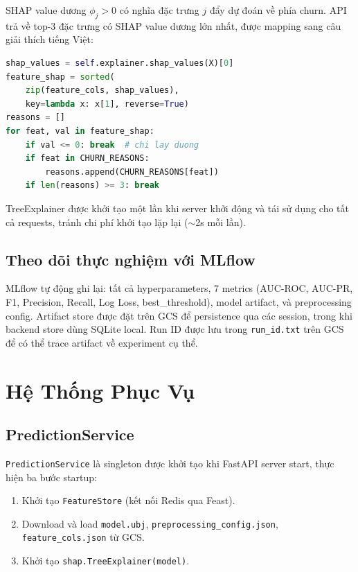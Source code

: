 \documentclass[conference]{IEEEtran}
\begin{document}
SHAP value dương $\phi_j > 0$ có nghĩa đặc trưng $j$ đẩy dự đoán về phía
churn. API trả về top-3 đặc trưng có SHAP value dương lớn nhất, được mapping
sang câu giải thích tiếng Việt:

\begin{lstlisting}[language=Python, caption={Top-3 SHAP reasons}]
shap_values = self.explainer.shap_values(X)[0]
feature_shap = sorted(
    zip(feature_cols, shap_values),
    key=lambda x: x[1], reverse=True)
reasons = []
for feat, val in feature_shap:
    if val <= 0: break  # chi lay duong
    if feat in CHURN_REASONS:
        reasons.append(CHURN_REASONS[feat])
    if len(reasons) >= 3: break
\end{lstlisting}

TreeExplainer được khởi tạo một lần khi server khởi động và tái sử dụng cho
tất cả requests, tránh chi phí khởi tạo lặp lại ($\sim$2s mỗi lần).

\subsection{Theo dõi thực nghiệm với MLflow}

MLflow tự động ghi lại: tất cả hyperparameters, 7 metrics (AUC-ROC, AUC-PR,
F1, Precision, Recall, Log Loss, best\_threshold), model artifact, và
preprocessing config. Artifact store được đặt trên GCS để persistence qua
các session, trong khi backend store dùng SQLite local. Run ID được lưu trong
\texttt{run\_id.txt} trên GCS để có thể trace artifact về experiment cụ thể.

\section{Hệ Thống Phục Vụ}
\label{sec:serving}

\subsection{PredictionService}

\texttt{PredictionService} là singleton được khởi tạo khi FastAPI server
start, thực hiện ba bước startup:

\begin{enumerate}
  \item Khởi tạo \texttt{FeatureStore} (kết nối Redis qua Feast).
  \item Download và load \texttt{model.ubj}, \texttt{preprocessing\_config.json},
        \texttt{feature\_cols.json} từ GCS.
  \item Khởi tạo \texttt{shap.TreeExplainer(model)}.
\end{enumerate}
\end{document}
